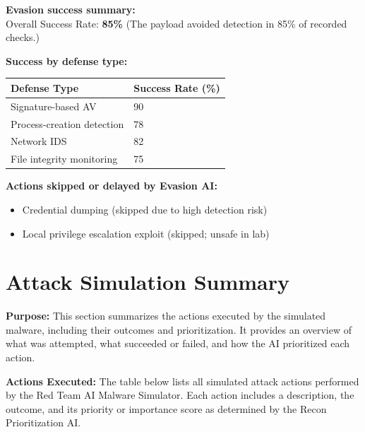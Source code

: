 \documentclass[a4paper,12pt]{article}
\begin{document}
\vspace{0.3cm}
\textbf{Evasion success summary:} \\
Overall Success Rate: \textbf{ 85\% }  
(The payload avoided detection in 85\% of recorded checks.)

\vspace{0.3cm}
\textbf{Success by defense type:}
\begin{longtable}{|p{6.5cm}|p{3cm}|}
\hline
\textbf{Defense Type} & \textbf{Success Rate (\%)} \\
\hline

    
Signature-based AV & 90 \\
\hline
    
Process-creation detection & 78 \\
\hline
    
Network IDS & 82 \\
\hline
    
File integrity monitoring & 75 \\
\hline
    

\end{longtable}

\vspace{0.3cm}


\vspace{0.3cm}
\textbf{Actions skipped or delayed by Evasion AI:} \\
\begin{itemize}
    
        
            \item Credential dumping (skipped due to high detection risk)
        
            \item Local privilege escalation exploit (skipped; unsafe in lab)
        
    
\end{itemize}

\newpage


\section*{Attack Simulation Summary}

\textbf{Purpose:} This section summarizes the actions executed by the simulated malware, including their outcomes and prioritization. It provides an overview of what was attempted, what succeeded or failed, and how the AI prioritized each action.

\vspace{0.3cm}
\textbf{Actions Executed:} The table below lists all simulated attack actions performed by the Red Team AI Malware Simulator. Each action includes a description, the outcome, and its priority or importance score as determined by the Recon Prioritization AI.
\end{document}
